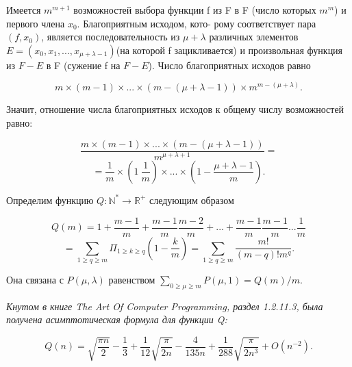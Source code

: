 \documentclass{../template/mai_book}
\begin{document}
\begin{myproof}
Имеется $m^{m+1}$ возможностей выбора функции f из F в F (число \linebreak которых $m^m$) и первого члена $x_{0}$. Благоприятным исходом, кото- \linebreak \indent рому соответствует пара $(f, x_{0})$, является последовательность из \linebreak \indent $\mu + \lambda$ различных элементов $E = (x_{0}, x_{1},..., x_{\mu + \lambda -1})$(на которой f \linebreak \indent зацикливается) и произвольная функция из $F - E$ в F (сужение f \linebreak \indent на $F - E$). Число благоприятных исходов равно \par 

$$m \times (m - 1) \times ... \times (m -(\mu + \lambda - 1)) \times m^{m - (\mu + \lambda)}.$$ \par 
Значит, отношение числа благоприятных исходов к общему числу возможностей равно: \par 

$$\frac{m \times (m - 1) \times ... \times (m - (\mu + \lambda - 1))}{m^{\mu + \lambda + 1}} =$$ $$= \frac{1}{m} \times (1 \ \frac{1}{m})\times ... \times (1 - \frac{\mu + \lambda - 1}{m}).$$ \par 
\end{myproof}
\begin{determ}
\slshape{Определим функцию $Q : \mathbb{N^{*}} \to \mathbb{R^{+}}$ следующим образом \par}

$$ Q(m) = 1 + \frac{m - 1}{m} + \frac{m - 1}{m}\frac{m - 2}{m} +...+\frac{m - 1}{m}\frac{m - 1}{m}...\frac{1}{m}$$ \linebreak
$$= \sum_{1 \geqslant q \geqslant m} \Pi_{1 \geqslant k \geqslant q}(1 - \frac{k}{m}) = \sum_{1 \geqslant q \geqslant m} \frac{m!}{(m - q)!m^{q}}.$$ \par 
\noindent Она связана с $P(\mu, \lambda)$ равенством $\sum_{0 \geqslant \mu \geqslant m}P(\mu,1) = Q(m)/m.$ \par 
\end{determ}
\begin{predl}
\slshape{Кнутом в книге The Art Of Computer Programming, раздел 1.2.11.3, была получена асимптотическая формула для функции Q:} \linebreak 

$$Q(n) = \sqrt{\frac{\pi n}{2}} - \frac{1}{3} + \frac{1}{12}\sqrt{\frac{\pi}{2n}} - \frac{4}{135n} + \frac{1}{288}\sqrt{\frac{\pi}{2n^{3}}} + O(n^{-2}).$$ \par 

 \linebreak
\end{predl}
\end{document}
